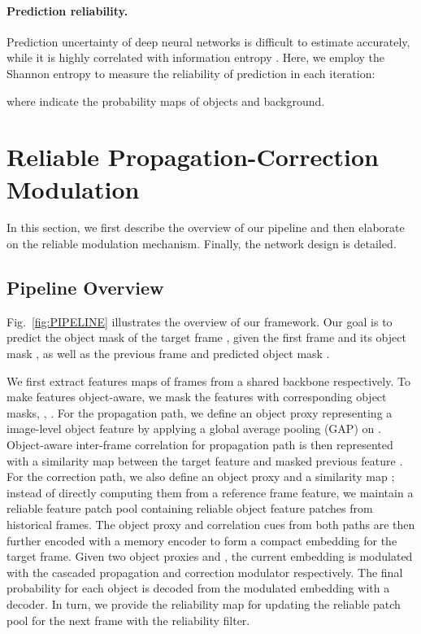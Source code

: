 \documentclass[letterpaper]{article} \usepackage{aaai22}  \usepackage{times}  \usepackage{helvet}  \usepackage{courier}  \usepackage[hyphens]{url}  \usepackage{graphicx} \urlstyle{rm} \def\UrlFont{\rm}  \usepackage{natbib}  \usepackage{caption} \DeclareCaptionStyle{ruled}{labelfont=normalfont,labelsep=colon,strut=off} \frenchspacing  \setlength{\pdfpagewidth}{8.5in}  \setlength{\pdfpageheight}{11in}  \usepackage{algorithm}
\newcommand{\fig}[1]{Fig.~#1}
\begin{document}
\paragraph{Prediction reliability.}
Prediction uncertainty of deep neural networks is difficult to estimate accurately, while it is highly correlated with information entropy \cite{272494}. Here, we employ the Shannon entropy to measure the reliability of prediction in each iteration:
\begin{small}

\end{small}
where  indicate the probability maps of  objects and background.


\section{Reliable Propagation-Correction Modulation}\label{sec:modulation}
In this section, we first describe the overview of our pipeline and then elaborate on the reliable modulation mechanism. Finally, the network design is detailed.

\subsection{Pipeline Overview}
\fig{\ref{fig:PIPELINE}} illustrates the overview of our framework. Our goal is to predict the object mask  of the target frame , given the first frame  and its object mask , as well as the previous frame  and predicted object mask .

We first extract features maps  of frames  from a shared backbone respectively.
To make features object-aware, we mask the features with corresponding object masks,   , .
For the propagation path, we define an object proxy  representing a image-level object feature by applying a global average pooling (GAP) on . Object-aware inter-frame correlation for propagation path is then represented with a similarity map  between the target feature  and masked previous feature .
For the correction path, we also define an object proxy  and a similarity map ; instead of directly computing them from a reference frame feature, we maintain a reliable feature patch pool containing reliable object feature patches from historical frames.
The object proxy and correlation cues from both paths are then further encoded with a memory encoder to form a compact embedding  for the target frame. Given two object proxies  and , the current embedding is modulated with the cascaded propagation and correction modulator respectively. 
The final probability  for each object is decoded from the modulated embedding with a decoder. 
In turn, we provide the reliability map  for updating the reliable patch pool  for the next frame with the reliability filter.
\end{document}
